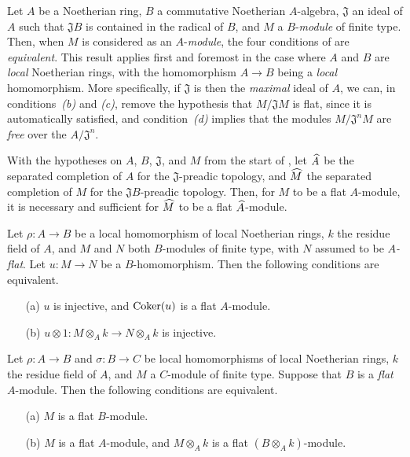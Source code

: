 \begin{env}[10.2.2]
\label{0.10.2.2}
Let $A$ be a Noetherian ring, $B$ a commutative Noetherian $A$-algebra, $\mathfrak{J}$ an ideal of $A$ such that $\mathfrak{J}B$ is contained in the radical of $B$, and $M$ a $B$-\emph{module} of finite type.
Then, when $M$ is considered as an $A$-\emph{module}, the four conditions of  are \emph{equivalent}.
This result applies first and foremost in the case where $A$ and $B$ are \emph{local} Noetherian rings, with the homomorphism $A\to B$ being a \emph{local} homomorphism.
More specifically, if $\mathfrak{J}$ is then the \emph{maximal} ideal of $A$, we can, in conditions~\emph{(b)} and \emph{(c)}, remove the hypothesis that $M/\mathfrak{J}M$ is flat, since it is automatically satisfied, and condition~\emph{(d)} implies that the modules $M/\mathfrak{J}^nM$ are \emph{free} over the $A/\mathfrak{J}^n$.
\end{env}

\begin{env}[10.2.3]
\label{0.10.2.3}
With the hypotheses on $A$, $B$, $\mathfrak{J}$, and $M$ from the start of , let ${\widehat{A}}$ be the separated completion of $A$ for the $\mathfrak{J}$-preadic topology, and ${\widehat{M}}$ the separated completion of $M$ for the $\mathfrak{J}B$-preadic topology.
Then, for $M$ to be a flat $A$-module, it is necessary and sufficient for ${\widehat{M}}$ to be a flat ${\widehat{A}}$-module.
\end{env}

\begin{env}[10.2.4]
\label{0.10.2.4}
Let $\rho:A\to B$ be a local homomorphism of local Noetherian rings, $k$ the residue field of $A$, and $M$ and $N$ both $B$-modules of finite type, with $N$ assumed to be \emph{$A$-flat}.
Let $u:M\to N$ be a $B$-homomorphism.
Then the following conditions are equivalent.
\begin{enumerate}
  \item[(a)] $u$ is injective, and $\operatorname{Coker}(u)$ is a flat $A$-module.
  \item[(b)] $u\otimes1:M\otimes_A k\to N\otimes_A k$ is injective.
\end{enumerate}
\end{env}

\begin{env}[10.2.5]
\label{0.10.2.5}
Let $\rho:A\to B$ and $\sigma:B\to C$ be local homomorphisms of local Noetherian rings, $k$ the residue field of $A$, and $M$ a $C$-module of finite type.
Suppose that $B$ is a \emph{flat} $A$-module.
Then the following conditions are equivalent.
\begin{enumerate}
  \item[(a)] $M$ is a flat $B$-module.
  \item[(b)] $M$ is a flat $A$-module, and $M\otimes_A k$ is a flat $(B\otimes_A k)$-module.
\end{enumerate}
\end{env}

